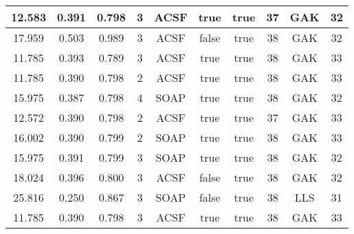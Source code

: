\documentclass[12pt]{article}
\begin{document}
\begin{table}[H]
\begin{tabular}{|c|c|c|c|c|c|c|c|c|c|}
		12.583	& 0.391	& 0.798	& 3	& ACSF	& true	& true	& 37	& GAK	& 32	\\ \hline
		17.959	& 0.503	& 0.989	& 3	& ACSF	& false	& true	& 38	& GAK	& 32	\\ \hline
		11.785	& 0.393	& 0.789	& 3	& ACSF	& true	& true	& 38	& GAK	& 33	\\ \hline
		11.785	& 0.390	& 0.798	& 2	& ACSF	& true	& true	& 38	& GAK	& 33	\\ \hline
		15.975	& 0.387	& 0.798	& 4	& SOAP	& true	& true	& 38	& GAK	& 32	\\ \hline
		12.572	& 0.390	& 0.798	& 2	& ACSF	& true	& true	& 37	& GAK	& 33	\\ \hline
		16.002	& 0.390	& 0.799	& 2	& SOAP	& true	& true	& 38	& GAK	& 33	\\ \hline
		15.975	& 0.391	& 0.799	& 3	& SOAP	& true	& true	& 38	& GAK	& 32	\\ \hline
		18.024	& 0.396	& 0.800	& 3	& ACSF	& false	& true	& 38	& GAK	& 32	\\ \hline
		25.816	& 0.250	& 0.867	& 3	& SOAP	& false	& true	& 38	& LLS	& 31	\\ \hline
		11.785	& 0.390	& 0.798	& 3	& ACSF	& true	& true	& 38	& GAK	& 33	\\ \hline
	\end{tabular}
	\label{tab:hyperopt}
\end{table}
\end{document}
